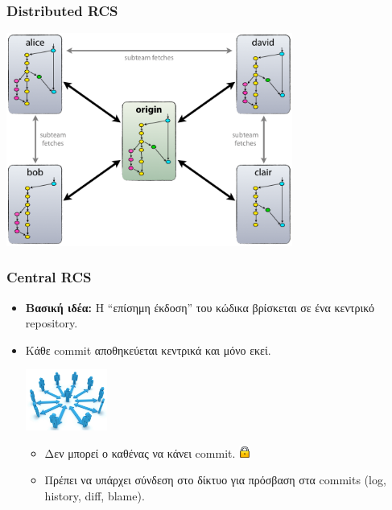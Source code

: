 \documentclass[]{beamer}
\begin{document}
\begin{frame}
  \frametitle{Distributed RCS}
  \begin{center}
    \includegraphics[height=7cm]{centr-decentr.png}
  \end{center}
\end{frame}

\begin{frame}
  \frametitle{Central RCS}
  \begin{itemize}
    \item \textbf{Βασική ιδέα:} Η ``επίσημη έκδοση'' του κώδικα βρίσκεται σε ένα
      κεντρικό repository.
    \item Κάθε commit αποθηκεύεται κεντρικά και μόνο εκεί.
      \begin{center}
        \includegraphics[height=2cm]{social_network.jpg} \hspace{0.5em}
      \end{center}\pause
      \begin{itemize}
      \item Δεν μπορεί ο καθένας να κάνει commit.
        \includegraphics[width=1em]{Lock1.png} \pause
      \item Πρέπει να υπάρχει σύνδεση στο δίκτυο για πρόσβαση στα commits (log,
        history, diff, blame).
      \end{itemize}
  \end{itemize}
\end{frame}
\end{document}
